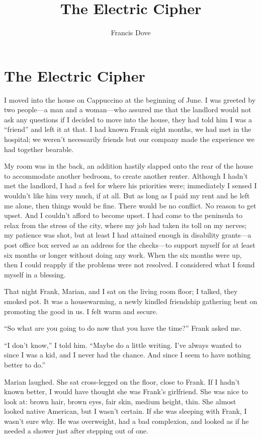 \documentclass[
]{article}
\title{The Electric Cipher}
\author{Francis Dove}
\date{}
\begin{document}
\maketitle

\section{The Electric Cipher}\label{the-electric-cipher}

I moved into the house on Cappuccino at the beginning of June. I was
greeted by two people---a man and a woman---who assured me that the
landlord would not ask any questions if I decided to move into the
house, they had told him I was a ``friend'' and left it at that. I had
known Frank eight months, we had met in the hospital; we weren't
necessarily friends but our company made the experience we had together
bearable.

My room was in the back, an addition hastily slapped onto the rear of
the house to accommodate another bedroom, to create another renter.
Although I hadn't met the landlord, I had a feel for where his
priorities were; immediately I sensed I wouldn't like him very much, if
at all. But as long as I paid my rent and he left me alone, then things
would be fine. There would be no conflict. No reason to get upset. And I
couldn't afford to become upset. I had come to the peninsula to relax
from the stress of the city, where my job had taken its toll on my
nerves; my patience was shot, but at least I had attained enough in
disability grants---a post office box served as an address for the
checks---to support myself for at least six months or longer without
doing any work. When the six months were up, then I could reapply if the
problems were not resolved. I considered what I found myself in a
blessing.

That night Frank, Marian, and I sat on the living room floor; I talked,
they smoked pot. It was a housewarming, a newly kindled friendship
gathering bent on promoting the good in us. I felt warm and secure.

``So what are you going to do now that you have the time?'' Frank asked
me.

``I don't know,'' I told him. ``Maybe do a little writing. I've always
wanted to since I was a kid, and I never had the chance. And since I
seem to have nothing better to do.''

Marian laughed. She sat cross-legged on the floor, close to Frank. If I
hadn't known better, I would have thought she was Frank's girlfriend.
She was nice to look at: brown hair, brown eyes, fair skin, medium
height, thin. She almost looked native American, but I wasn't certain.
If she was sleeping with Frank, I wasn't sure why. He was overweight,
had a bad complexion, and looked as if he needed a shower just after
stepping out of one.
\end{document}
